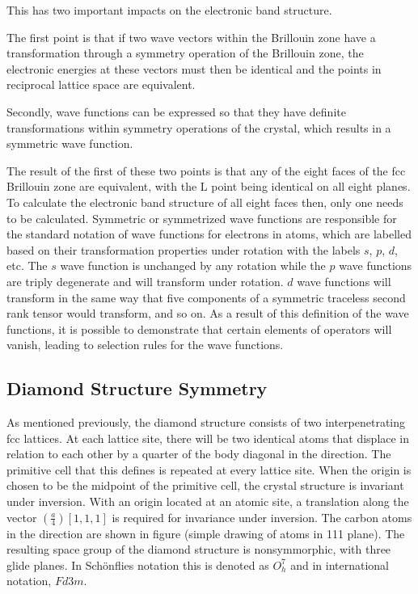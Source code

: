 This has two important impacts on the electronic band structure. 

The first point is that if two wave vectors within the Brillouin zone have a transformation through a symmetry operation of the Brillouin zone, the electronic energies at these vectors must then be identical and the points in reciprocal lattice space are equivalent. 

Secondly, wave functions can be expressed so that they have definite transformations within symmetry operations of the crystal, which results in a symmetric wave function.

The result of the first of these two points is that any of the eight faces of the fcc Brillouin zone are equivalent, with the L point being identical on all eight planes. To calculate the electronic band structure of all eight faces then, only one needs to be calculated. Symmetric or symmetrized wave functions are responsible for the standard notation of wave functions for electrons in atoms, which are labelled based on their transformation properties under rotation with the labels $s$, $p$, $d$, etc. The $s$ wave function is unchanged by any rotation while the $p$ wave functions are triply degenerate and will transform under rotation. $d$ wave functions will transform in the same way that five components of a symmetric traceless second rank tensor would transform, and so on. As a result of this definition of the wave functions, it is possible to demonstrate that certain elements of operators will vanish, leading to selection rules for the wave functions.

\subsection{Diamond Structure Symmetry}

As mentioned previously, the diamond structure consists of two interpenetrating fcc lattices. At each lattice site, there will be two identical atoms that displace in relation to each other by a quarter of the body diagonal in the \hkl[111] direction. The primitive cell that this defines is repeated at every lattice site. When the origin is chosen to be the midpoint of the primitive cell, the crystal structure is invariant under inversion. With an origin located at an atomic site, a translation along the vector $\left(\frac{a}{4}\right)[1,1,1]$ is required for invariance under inversion. The carbon atoms in the \hkl[111] direction are shown in figure (simple drawing of atoms in 111 plane). The resulting space group of the diamond structure is nonsymmorphic, with three glide planes. In Sch{\"o}nflies notation this is denoted as $O_{h}^{7}$ and in international notation, $Fd3m$.

